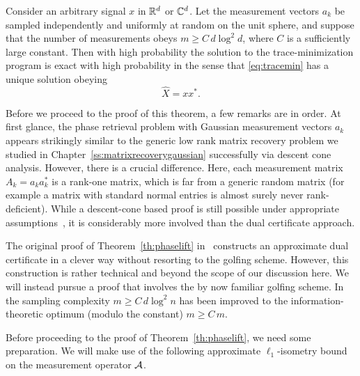 \begin{theorem}\cite{CSV2013}
\label{th:phaselift}
Consider an arbitrary signal $x$ in $\mathbb{R}^d$ or $\mathbb{C}^d$. Let the measurement vectors $a_k$  be sampled independently and uniformly at
random on the unit sphere, and suppose that the number of measurements obeys $m \ge C \, d \log^2 d$, where
$C$ is a sufficiently large constant. Then with high probability the solution to the trace-minimization program is exact
with high probability in the sense that \eqref{eq:tracemin} has a
unique solution obeying
\begin{equation}
  \hat X = x x^\ast.
\end{equation}
\end{theorem}

Before we proceed to the proof of this theorem, a few remarks are in order.
At first glance, the phase retrieval problem with Gaussian measurement vectors $a_k$ appears strikingly similar to the generic low rank matrix recovery problem we studied in Chapter~\ref{ss:matrixrecoverygaussian} successfully via descent cone analysis. However, there is a crucial difference. Here, each measurement matrix $A_k = a_k a_k^*$ is a rank-one matrix, which is far from a generic random matrix (for example a matrix with
standard normal entries is almost surely never rank-deficient).
While a descent-cone based proof is still possible under appropriate assumptions~\cite{fuchs2022proof}, it is considerably more involved than the dual certificate approach.

The original proof of Theorem~\ref{th:phaselift} in~\cite{CSV2013} constructs an approximate dual certificate in a clever way without resorting to the golfing scheme.  However, this construction is rather technical and beyond the scope of our discussion here. We will instead pursue a proof that involves the by now familiar golfing scheme.
In~\cite{candes2014solving} the sampling complexity $m \ge C \, d \log^2 n$ has been improved to the information-theoretic optimum (modulo the constant) $m \ge C \, m$.



Before proceeding to the proof of Theorem~\ref{th:phaselift}, we need some preparation.
We will make use of the following approximate $\ell_1$-isometry bound on the measurement operator ${\mathcal A}$.


